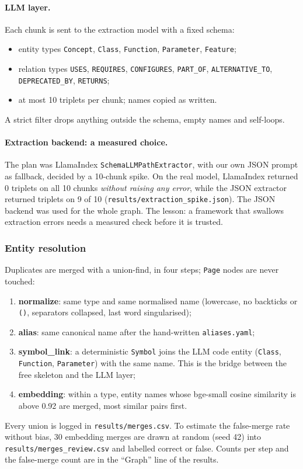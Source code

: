 \documentclass[11pt,a4paper]{article}
\newcommand{\code}[1]{\texttt{#1}}
\begin{document}
\paragraph{LLM layer.} Each chunk is sent to the extraction model with a fixed schema:
\begin{itemize}
  \item entity types \code{Concept}, \code{Class}, \code{Function}, \code{Parameter},
  \code{Feature};
  \item relation types \code{USES}, \code{REQUIRES}, \code{CONFIGURES}, \code{PART\_OF},
  \code{ALTERNATIVE\_TO}, \code{DEPRECATED\_BY}, \code{RETURNS};
  \item at most 10 triplets per chunk; names copied as written.
\end{itemize}
A strict filter drops anything outside the schema, empty names and self-loops.

\paragraph{Extraction backend: a measured choice.} The plan was LlamaIndex
\code{SchemaLLMPathExtractor}, with our own JSON prompt as fallback, decided by a 10-chunk spike.
On the real model, LlamaIndex returned 0 triplets on all 10 chunks \emph{without raising any
error}, while the JSON extractor returned triplets on 9 of 10
(\code{results/extraction\_spike.json}). The JSON backend was used for the whole graph. The
lesson: a framework that swallows extraction errors needs a measured check before it is trusted.

\subsubsection{Entity resolution}

Duplicates are merged with a union-find, in four steps; \code{Page} nodes are never touched:
\begin{enumerate}
  \item \textbf{normalize}: same type and same normalised name (lowercase, no backticks or
  \code{()}, separators collapsed, last word singularised);
  \item \textbf{alias}: same canonical name after the hand-written \code{aliases.yaml};
  \item \textbf{symbol\_link}: a deterministic \code{Symbol} joins the LLM code entity
  (\code{Class}, \code{Function}, \code{Parameter}) with the same name. This is the bridge between
  the free skeleton and the LLM layer;
  \item \textbf{embedding}: within a type, entity names whose bge-small cosine similarity is
  above 0.92 are merged, most similar pairs first.
\end{enumerate}
Every union is logged in \code{results/merges.csv}. To estimate the false-merge rate without
bias, 30 embedding merges are drawn at random (seed 42) into \code{results/merges\_review.csv}
and labelled correct or false. Counts per step and the false-merge count are in the ``Graph''
line of the results.
\end{document}
